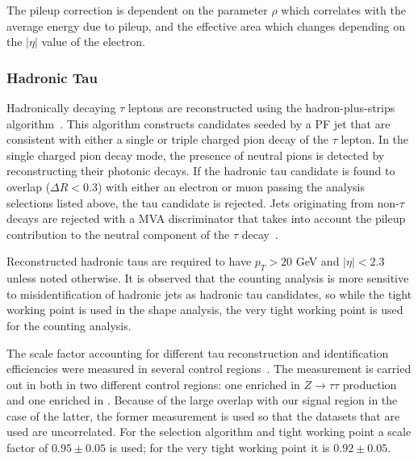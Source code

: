 The pileup correction is dependent on the parameter $\rho$ which correlates with the average energy due to pileup, and the effective area which changes depending on the $|\eta|$ value of the electron.





\subsubsection{Hadronic Tau}

Hadronically decaying $\tau$ leptons are reconstructed using the hadron-plus-strips algorithm~\cite{ref:cms-tau}. This algorithm constructs candidates seeded by a PF jet that are consistent with either a single or triple charged pion decay of the $\tau$ lepton.  In the single charged pion decay mode, the presence of neutral pions is detected by reconstructing their photonic decays. If the hadronic tau candidate is found to overlap ($\Delta R < 0.3$) with either an electron or muon passing the analysis selections listed above, the tau candidate is rejected. Jets originating from non-$\tau$ decays are rejected with a MVA discriminator that takes into account the pileup contribution to the neutral component of the $\tau$ decay~\cite{CMS-TAU-16-003-001}.  

Reconstructed hadronic taus are required to have $p_{T} > 20$ GeV and $|\eta| < 2.3$ unless noted otherwise.  It is observed that the counting analysis is more sensitive to misidentification of hadronic jets as hadronic tau candidates, so while the tight working point is used in the shape analysis, the very tight working point is used for the counting analysis.

The scale factor accounting for different tau reconstruction and identification efficiencies were measured in several control regions~\cite{CMS-TAU-16-003-001}.  The measurement is carried out in both in two different control regions: one enriched in $Z\to\tau\tau$ production and one enriched in \ttbar.  Because of the large overlap with our signal region in the case of the latter, the former measurement is used so that the datasets that are used are uncorrelated.  For the selection algorithm and tight working point a scale factor of $0.95 \pm 0.05$ is used; for the very tight working point it is $0.92 \pm 0.05$.






